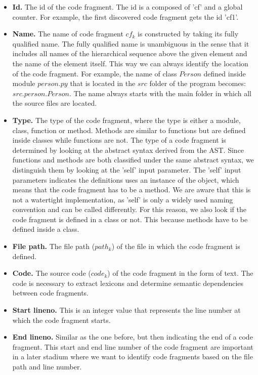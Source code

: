 \begin{itemize}
    \item \textbf{Id.} The id of the code fragment. The id is a composed of 'cf' and a global counter. For example, the first discovered code fragment gets the id 'cf1'.
    \item \textbf{Name.} The name of code fragment $cf_k$ is constructed by taking its fully qualified name. The fully qualified name is unambiguous in the sense that it includes all names of the hierarchical sequence above the given element and the name of the element itself. This way we can always identify the location of the code fragment. For example, the name of class $Person$ defined inside module $person.py$ that is located in the  $src$ folder of the program becomes: $src.person.Person$. The name always starts with the main folder in which all the source files are located.
    \item \textbf{Type.} The type of the code fragment, where the type is either a module, class, function or method. Methods are similar to functions but are defined inside classes while functions are not. The type of a code fragment is determined by looking at the abstract syntax derived from the AST. Since functions and methods are both classified under the same abstract syntax, we distinguish them by looking at the 'self' input parameter. The 'self' input parameters indicates the definitions uses an instance of the object, which means that the code fragment has to be a method. We are aware that this is not a watertight implementation, as 'self' is only a widely used naming convention and can be called differently. For this reason, we also look if the code fragment is defined in a class or not. This because methods have to be defined inside a class. 
    \item \textbf{File path.} The file path ($path_k$) of the file in which the code fragment is defined. 
    \item \textbf{Code.} The source code ($code_k$) of the code fragment in the form of text. The code is necessary to extract lexicons and determine semantic dependencies between code fragments.
    \item \textbf{Start lineno.} This is an integer value that represents the line number at which the code fragment starts.
    \item \textbf{End lineno.} Similar as the one before, but then indicating the end of a code fragment. This start and end line number of the code fragment are important in a later stadium where we want to identify code fragments based on the file path and line number.

\end{itemize}
